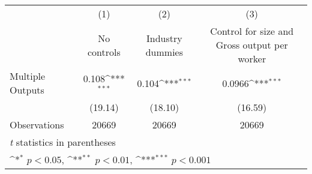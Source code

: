 {
\def\sym#1{\ifmmode^{#1}\else\(^{#1}\)\fi}
\begin{tabular}{l*{3}{c}}
\toprule
                    &\multicolumn{1}{c}{(1)}&\multicolumn{1}{c}{(2)}&\multicolumn{1}{c}{(3)}\\
                    &\multicolumn{1}{c}{No controls}&\multicolumn{1}{c}{Industry dummies}&\multicolumn{1}{c}{Control for size and Gross output per worker}\\
\midrule
Multiple Outputs    &       0.108\sym{***}&       0.104\sym{***}&      0.0966\sym{***}\\
                    &     (19.14)         &     (18.10)         &     (16.59)         \\
\midrule
Observations        &       20669         &       20669         &       20669         \\
\bottomrule
\multicolumn{4}{l}{\footnotesize \textit{t} statistics in parentheses}\\
\multicolumn{4}{l}{\footnotesize \sym{*} \(p<0.05\), \sym{**} \(p<0.01\), \sym{***} \(p<0.001\)}\\
\end{tabular}
}
